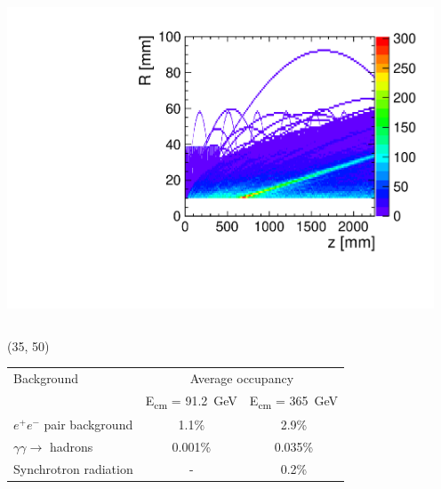 \documentclass[final,xcolor={dvipsnames,svgnames,x11names,table}]{beamer}
\begin{document}
\begin{frame}
\begin{textblock}{34.2}
\begin{tcolorbox}[title=Beam-induced backgrounds]
  \begin{columns}

    \centering
    \includegraphics[width=5in]{../figures/pairs_R_Z}
  \end{columns}

  \end{tcolorbox}
\end{textblock}

\begin{textblock}{34.2}(35, 50)
  \begin{tcolorbox}[title=Beam-induced backgrounds]

  \centering
	\begin{tabular}{l c c}
  	\toprule
	   Background & \multicolumn{2}{c}{Average occupancy} \\
	    & E\textsubscript{cm} = 91.2~GeV &  E\textsubscript{cm} = 365~GeV \\
	   \midrule
	   $e^+e^-$ pair background & 1.1\% & 2.9\% \\
	   $\gamma\gamma\rightarrow$ hadrons & 0.001\% & 0.035\%  \\
	   Synchrotron radiation & - & 0.2\% \\
	   \bottomrule
	\end{tabular}

  \end{tcolorbox}
\end{textblock}

\end{frame}
\end{document}
